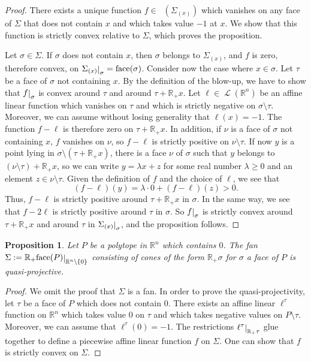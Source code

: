 \documentclass[11pt]{amsart}
\newtheorem{prop}[thm]{Proposition}
\theoremstyle{definition}
\numberwithin{equation}{section}
\renewcommand{\~}{\widetilde}
\newcommand{\R}{\mathbb{R}}
\newcommand{\rest}[1]{\raisebox{-1pt}{$\vert$}_{#1}}
\newcommand{\cone}{\R_+} %
\DeclareMathOperator{\aff}{\mathcal L} %
\DeclareMathOperator{\lpm}{\mathcal L^{pm}} %
\DeclareMathOperator{\faceop}{face}
\newcommand{\face}[1]{\faceop(#1)} %
\begin{document}
\begin{proof} There exists a unique function $ f \in \lpm (\Sigma_{(x)}) $ which vanishes on any face of $\Sigma$ that does not contain $x$ and which takes value $ -1 $ at $ x $. We show that this function is strictly convex relative to $\Sigma$, which proves the proposition.

Let $\sigma \in \Sigma$. If $\sigma$ does not contain $x$, then $\sigma$ belongs to $\Sigma_{(x)}$, and $f$ is zero, therefore convex, on $\Sigma_{(x)}\rest\sigma=\face{\sigma}$. Consider now the case where $ x \in \sigma $. Let $ \tau $ be a face of $ \sigma$ not containing $x$. By the definition of the blow-up, we have to show that $ f \rest \sigma$ is convex around $ \tau $ and around $ \tau + \R_+ x $. Let $ \ell \in \aff (\R^n)$ be an affine linear function which vanishes on $\tau $ and which is strictly negative on $ \sigma \setminus \tau $. Moreover, we can assume without losing generality that $ \ell(x) = -1 $. The function $f-\ell$ is therefore zero on $\tau + \R_+ x $. In addition, if $\nu$ is a face of $\sigma$ not containing $x$, $f$ vanishes on $\nu$, so $f-\ell$ is strictly positive on $\nu \setminus \tau$. If now $y$ is a point lying in $\sigma \setminus (\tau + \R_+ x)$, there is a face $\nu$ of $\sigma$ such that $ y$ belongs to $(\nu \setminus \tau) + \R_+ x$, so we can write $y = \lambda x + z $ for some real number $\lambda \geq 0$ and an element $z \in \nu \setminus \tau$. Given the definition of $f$ and the choice of $\ell$, we see that
\[ (f- \ell) (y) = \lambda \cdot0 + (f- \ell) (z)> 0. \]
Thus, $f-\ell$ is strictly positive around $\tau + \R_+ x$ in $\sigma$. In the same way, we see that $f-2\ell$ is strictly positive around $\tau$ in $\sigma$. So $f\rest \sigma$ is strictly convex around $\tau + \R_+ x$ and around $\tau$ in $\Sigma_{(x)}\rest \sigma$, and the proposition follows.
\end{proof}

\begin{prop} \label{prop:polyedre_convexe}
Let $P$ be a polytope in $\R^n$ which contains $0$. The fan $\Sigma:=\cone{\face{P}\rest{\R^n\setminus\{0\}}}$ consisting of cones of the form $\R_+\sigma$ for $\sigma$ a face of $P$ is quasi-projective.
\end{prop}

\begin{proof} We omit the proof that $\Sigma$ is a fan. In order to prove the quasi-projectivity, let $\tau$ be a face of $P$ which does not contain $0$. There exists an affine linear $\ell^\tau$ function on $\R^n$ which takes value $0$ on $\tau$ and which takes negative values on $P \setminus \tau$. Moreover, we can assume that $\ell^\tau(0)=-1$.
The restrictions $\ell^\tau\rest{\cone{\tau}}$ glue together to define a piecewise affine linear function $f$ on $\Sigma$. One can show that $f$ is strictly convex on $\Sigma$.
\end{proof}
\end{document}
